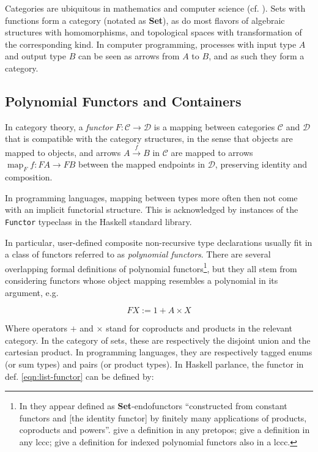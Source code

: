 \documentclass[a4paper]{article}
\DeclareMathOperator{\map}{map}
\newcommand{\catname}[1]{{\normalfont\textbf{#1}}}
\newcommand{\Set}{\catname{Set}}
\begin{document}
Categories are ubiquitous in mathematics and computer science (cf. \cite{Walters1992}). Sets with functions form a category (notated as \Set{}), as do most flavors of algebraic structures with homomorphisms, and topological spaces with transformation of the corresponding kind. In computer programming, processes with input type \(A\) and output type \(B\) can be seen as arrows from \(A\) to \(B\), and as such they form a category.

\subsection{Polynomial Functors and Containers}

In category theory, a \textit{functor} \(F : \mathcal C \to \mathcal D\) is a mapping between categories \(\mathcal C\) and \(\mathcal D\) that is compatible with the category structures, in the sense that objects are mapped to objects, and arrows \(A \xrightarrow{f} B\) in \(\mathcal C\) are mapped to arrows \(\map_F f : F A \to F B\) between the mapped endpoints in \(\mathcal D\), preserving identity and composition.

In programming languages, mapping between types more often then not come with an implicit functorial structure. This is acknowledged by instances of the \texttt{Functor} typeclass in the Haskell standard library.

In particular, user-defined composite non-recursive type declarations usually fit in a class of functors referred to as \textit{polynomial functors}. There are several overlapping formal definitions of polynomial functors\footnote{In \cite{Goldblatt2001} they appear defined as \Set{}-endofunctors ``constructed from constant functors and [the identity functor] by finitely many applications of products, coproducts and powers''. \textcite{Moerdijk2000} give a definition in any pretopos; \textcite{Gambino2004} give a definition in any \gls{lccc}; \textcite{Gambino2009} give a definition for indexed polynomial functors also in a \gls{lccc}.}, but they all stem from considering functors whose object mapping resembles a polynomial in its argument, e.g.

\begin{equation}
	\label{eqn:list-functor}
	F X := 1 + A \times X
\end{equation}

Where operators \(+\) and \(\times\) stand for coproducts and products in the relevant category. In the category of sets, these are respectively the disjoint union and the cartesian product. In programming languages, they are respectively tagged enums (or sum types) and pairs (or product types). In Haskell parlance, the functor in def. \ref{eqn:list-functor} can be defined by:
\end{document}
